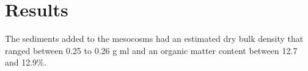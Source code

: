 \section{Results}

The sediments added to the mesocosms had an estimated dry bulk density that ranged between 0.25 to 0.26 g ml and an organic matter content between 12.7 and 12.9\%. 
